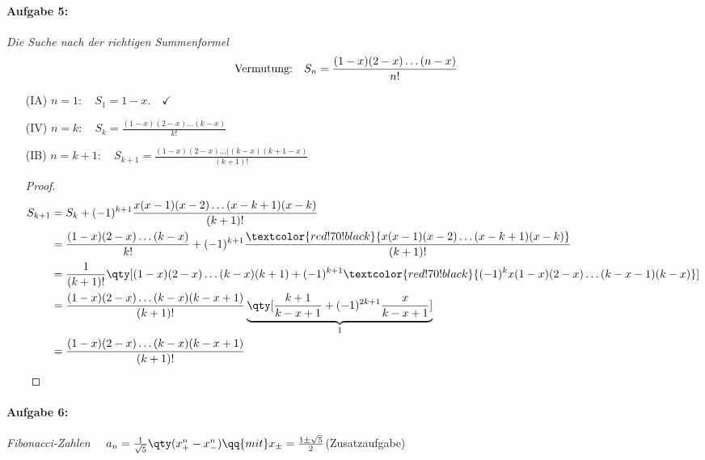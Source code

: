 \paragraph{Aufgabe 5: } \emph{Die Suche nach der richtigen Summenformel}\\
\begin{align}
\text{Vermutung: }\hspace{0.2cm} S_n=\frac{(1-x)(2-x)\dots(n-x)}{n!} \hspace{0.5cm}
\end{align}

\begin{enumerate}
    \setlength{\mathindent}{0cm}
    \item[(IA)] $n=1: \quad S_1 = 1-x. \quad\checkmark$ 
    \item[(IV)] $n=k: \quad S_k = \frac{(1-x)(2-x)\dots(k-x)}{k!}$
    \item[(IB)] $n=k+1: \quad S_{k+1} = \frac{(1-x)(2-x)\dots((k-x)(k+1-x)}{(k+1)!}$\\
    \begin{proof}
        \begin{align}
            S_{k+1}&=S_k+(-1)^{k+1}\frac{x(x-1)(x-2)\dots(x-k+1)(x-k)}{(k+1)!}\\
            &=\frac{(1-x)(2-x)\dots(k-x)}{k!}+(-1)^{k+1}\frac{\textcolor{red!70!black}{x(x-1)(x-2)\dots(x-k+1)(x-k)}}{(k+1)!}\\
            &=\frac{1}{(k+1)!}\qty[(1-x)(2-x)\dots(k-x)(k+1)+(-1)^{k+1}\textcolor{red!70!black}{(-1)^k x(1-x)(2-x)\dots(k-x-1)(k-x)}]\\
            &=\frac{(1-x)(2-x)\dots(k-x)(k-x+1)}{(k+1)!}\underbrace{\qty[\frac{k+1}{k-x+1}+(-1)^{2k+1}\frac{x}{k-x+1}]}_1\\
            &=\frac{(1-x)(2-x)\dots(k-x)(k-x+1)}{(k+1)!}
        \end{align}
    \end{proof}
\end{enumerate}

\paragraph{Aufgabe 6: } \emph{Fibonacci-Zahlen} $\quad a_n=\frac{1}{\sqrt{5}}\qty(x_+^n-x_-^n) \qq{mit}x_\pm = \frac{1\pm \sqrt{5}}{2}$\hfill (Zusatzaufgabe)

